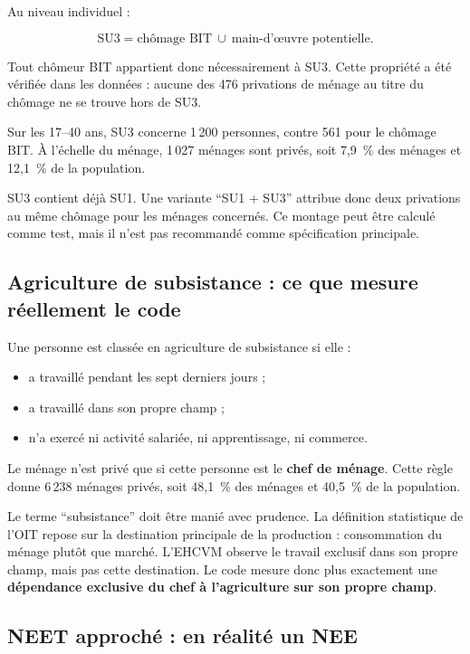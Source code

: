\documentclass[11pt,a4paper]{article}
\begin{document}
Au niveau individuel :

\[
  \text{SU3} = \text{chômage BIT} \ \cup\ \text{main-d'œuvre potentielle}.
\]

Tout chômeur BIT appartient donc nécessairement à SU3. Cette propriété a été vérifiée dans les
données : aucune des 476 privations de ménage au titre du chômage ne se trouve hors de SU3.

Sur les 17--40 ans, SU3 concerne 1\,200 personnes, contre 561 pour le chômage BIT. À l'échelle du
ménage, 1\,027 ménages sont privés, soit 7,9~\% des ménages et 12,1~\% de la population.

\begin{attention}
SU3 contient déjà SU1. Une variante ``SU1 + SU3'' attribue donc deux privations au même chômage
pour les ménages concernés. Ce montage peut être calculé comme test, mais il n'est pas recommandé
comme spécification principale.
\end{attention}

\subsection{Agriculture de subsistance : ce que mesure réellement le code}

Une personne est classée en agriculture de subsistance si elle :

\begin{itemize}
  \item a travaillé pendant les sept derniers jours ;
  \item a travaillé dans son propre champ ;
  \item n'a exercé ni activité salariée, ni apprentissage, ni commerce.
\end{itemize}

Le ménage n'est privé que si cette personne est le \textbf{chef de ménage}. Cette règle donne
6\,238 ménages privés, soit 48,1~\% des ménages et 40,5~\% de la population.

Le terme ``subsistance'' doit être manié avec prudence. La définition statistique de l'OIT repose
sur la destination principale de la production : consommation du ménage plutôt que marché.
L'EHCVM observe le travail exclusif dans son propre champ, mais pas cette destination. Le code
mesure donc plus exactement une \textbf{dépendance exclusive du chef à l'agriculture sur son
propre champ}.

\subsection{NEET approché : en réalité un NEE}
\end{document}

